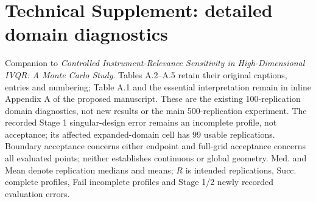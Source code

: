 

\section*{Technical Supplement: detailed domain diagnostics}
\noindent Companion to \emph{Controlled Instrument-Relevance Sensitivity in High-Dimensional IVQR: A Monte Carlo Study}. Tables A.2--A.5 retain their original captions, entries and numbering; Table A.1 and the essential interpretation remain in inline Appendix A of the proposed manuscript. These are the existing 100-replication domain diagnostics, not new results or the main 500-replication experiment. The recorded Stage 1 singular-design error remains an incomplete profile, not acceptance; its affected expanded-domain cell has 99 usable replications. Boundary acceptance concerns either endpoint and full-grid acceptance concerns all evaluated points; neither establishes continuous or global geometry. Med. and Mean denote replication medians and means; $R$ is intended replications, Succ. complete profiles, Fail incomplete profiles and Stage 1/2 newly recorded evaluation errors.
\renewcommand{\thetable}{A.\arabic{table}}
\setcounter{table}{1}


